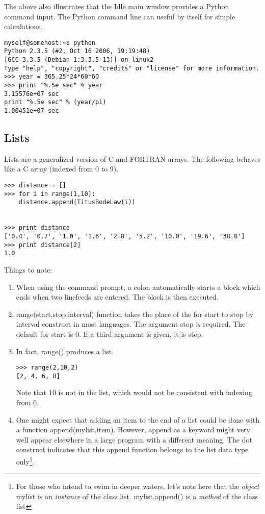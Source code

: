 \documentclass{article}
\begin{document}
The above also illustrates that the Idle main window provides a Python command input.
The Python command line can useful by itself for simple calculations.
{\small \begin{verbatim}
myself@somehost:~$ python
Python 2.3.5 (#2, Oct 16 2006, 19:19:48)
[GCC 3.3.5 (Debian 1:3.3.5-13)] on linux2
Type "help", "copyright", "credits" or "license" for more information.
>>> year = 365.25*24*60*60
>>> print "%.5e sec" % year
3.15576e+07 sec
print "%.5e sec" % (year/pi)
1.00451e+07 sec
\end{verbatim}}

\subsection{Lists}

Lists are a generalized version of C and FORTRAN arrays. The following behaves like
a C array (indexed from 0 to 9).
\begin{verbatim}
>>> distance = []
>>> for i in range(1,10):
	distance.append(TitusBodeLaw(i))

	
>>> print distance
['0.4', '0.7', '1.0', '1.6', '2.8', '5.2', '10.0', '19.6', '38.8']
>>> print distance[2]
1.0
\end{verbatim}
Things to note:
\begin{enumerate}
\item When using the command prompt, a colon automatically starts a block
which ends when two linefeeds are entered. The block is then executed.
\item {\ttfamily range(start,stop,interval)} function takes the place of the
{\ttfamily for start to stop by interval} construct in most languages.
The argument {\ttfamily stop} is required. The default for {\ttfamily start}
is 0. If a third argument is given, it is {\ttfamily step}.
\item In fact, {\ttfamily range()} produces a list.
\begin{verbatim}
>>> range(2,10,2)
[2, 4, 6, 8]
\end{verbatim}
Note that 10 is not in the list, which would not be consistent with indexing
from 0.
\item One might expect that adding an item to the end of a list could be
done with a function {\ttfamily append(mylist,item)}.  However, {\ttfamily
append} as a keyword might very well appear elsewhere in a large program with
a different
meaning.  The dot construct indicates that this {\ttfamily append} function
belongs to the list data type only\footnote{For those who intend to swim in
deeper waters, let's note here that
the {\itshape object} {\ttfamily mylist} is an {\itshape instance} of the
{\itshape class} {\ttfamily list}. {\ttfamily mylist.append()} is a {\itshape
method} of the class {\ttfamily list}}.
\end{enumerate}
\end{document}

